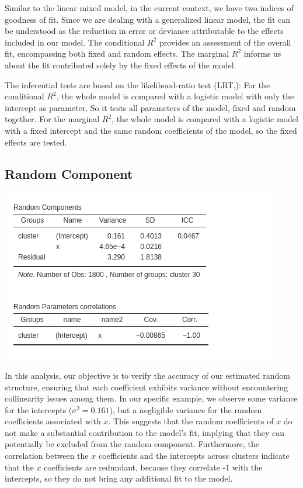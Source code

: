 \documentclass[
]{book}
\begin{document}
Similar to the linear mixed model, in the current context, we have two indices of goodness of fit. Since we are dealing with a generalized linear model, the fit can be understood as the reduction in error or deviance attributable to the effects included in our model. The conditional \(R^2\) provides an assessment of the overall fit, encompassing both fixed and random effects. The marginal \(R^2\) informs us about the fit contributed solely by the fixed effects of the model.

The inferential tests are based on the likelihood-ratio test (LRT,): For the conditional \(R^2\), the whole model is compared with a logistic model with only the intercept as parameter. So it tests all parameters of the model, fixed and random together. For the marginal \(R^2\), the whole model is compared with a logistic model with a fixed intercept and the same random coefficients of the model, so the fixed effects are tested.

\hypertarget{random-component}{%
\subsection{Random Component}\label{random-component}}

\includegraphics[width=0.8\linewidth]{bookletpics/5_logistic_output3}

In this analysis, our objective is to verify the accuracy of our estimated random structure, ensuring that each coefficient exhibits variance without encountering collinearity issues among them. In our specific example, we observe some variance for the intercepts (\(\sigma^2 = 0.161\)), but a negligible variance for the random coefficients associated with \(x\). This suggests that the random coefficients of \(x\) do not make a substantial contribution to the model's fit, implying that they can potentially be excluded from the random component. Furthermore, the correlation between the \(x\) coefficients and the intercepts across clusters indicate that the \(x\) coefficients are redundant, because they correlate -1 with the intercepts, so they do not bring any additional fit to the model.
\end{document}
